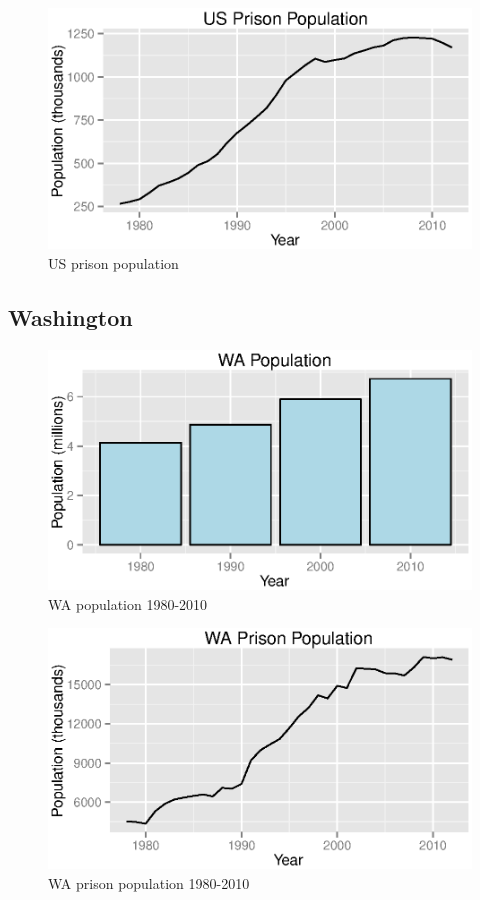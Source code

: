 \documentclass{exam}
\begin{document}
  \begin{figure}[H]
    \centering
    \includegraphics[scale = 0.9]{figures/us_prison_population.eps}
    \caption{US prison population}
  \end{figure}

  \subsection{Washington}

  \begin{figure}[H]
    \centering
    \includegraphics[scale = 0.9]{figures/wa_population.eps}
    \caption{WA population 1980-2010}
  \end{figure}

  \begin{figure}[H]
    \centering
    \includegraphics[scale = 0.9]{figures/wa_prison_population.eps}
    \caption{WA prison population 1980-2010}
  \end{figure}
\end{document}
